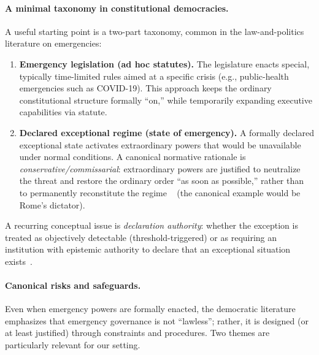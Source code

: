 \documentclass[12pt]{article}
\begin{document}
\paragraph{A minimal taxonomy in constitutional democracies.}
A useful starting point is a two-part taxonomy, common in the law-and-politics literature on
emergencies:
\begin{enumerate}
    \item \textbf{Emergency legislation (ad hoc statutes).}
    The legislature enacts special, typically time-limited rules aimed at a specific crisis (e.g.,
    public-health emergencies such as COVID-19). This approach keeps the ordinary constitutional structure formally
    ``on,'' while temporarily expanding executive capabilities via statute.
    \item \textbf{Declared exceptional regime (state of emergency).}
    A formally declared exceptional state activates extraordinary powers that would be unavailable
    under normal conditions. A canonical normative rationale is \emph{conservative/commissarial}:
    extraordinary powers are justified to neutralize the threat and restore the ordinary order ``as
    soon as possible,'' rather than to permanently reconstitute the regime
   ~\cite{ferejohn2004law} (the canonical example would be Rome's dictator).
\end{enumerate}
A recurring conceptual issue is \emph{declaration authority}: whether the exception is treated as
objectively detectable (threshold-triggered) or as requiring an institution with epistemic authority to
declare that an exceptional situation exists~\cite{ferejohn2004law}.

\paragraph{Canonical risks and safeguards.}
Even when emergency powers are formally enacted, the democratic literature emphasizes that emergency
governance is not ``lawless''; rather, it is designed (or at least justified) through constraints and
procedures. Two themes are particularly relevant for our setting.
\end{document}
